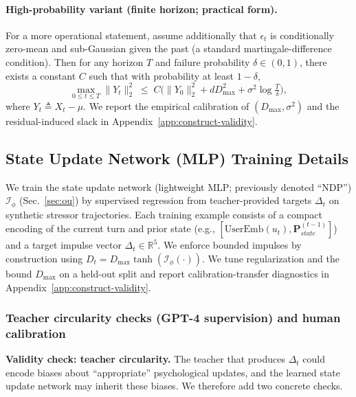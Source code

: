 \documentclass{article}
\begin{document}
\paragraph{High-probability variant (finite horizon; practical form).}
For a more operational statement, assume additionally that $\epsilon_t$ is conditionally zero-mean and sub-Gaussian given the past (a standard martingale-difference condition).
Then for any horizon $T$ and failure probability $\delta\in(0,1)$, there exists a constant $C$ such that with probability at least $1-\delta$,
\begin{equation}
\max_{0\le t\le T}\|Y_t\|_2^2 \;\le\; C\Big(\|Y_0\|_2^2 + dD_{\max}^2 + \sigma^2\log\tfrac{T}{\delta}\Big),
\end{equation}
where $Y_t\triangleq X_t-\mu$.
We report the empirical calibration of $(D_{\max},\sigma^2)$ and the residual-induced slack in Appendix~\ref{app:construct-validity}.



\subsection{State Update Network (MLP) Training Details}
\label{app:impact-table-training}
We train the state update network (lightweight MLP; previously denoted ``NDP'') $\mathcal{I}_\phi$ (Sec.~\ref{sec:ou}) by supervised regression from teacher-provided targets $\Delta_t$ on synthetic stressor trajectories.
Each training example consists of a compact encoding of the current turn and prior state (e.g., $[\text{UserEmb}(u_t),\mathbf{P}_{state}^{(t-1)}]$) and a target impulse vector $\Delta_t\in\mathbb{R}^5$.
We enforce bounded impulses by construction using $D_t=D_{\max}\tanh(\mathcal{I}_\phi(\cdot))$.
We tune regularization and the bound $D_{\max}$ on a held-out split and report calibration-transfer diagnostics in Appendix~\ref{app:construct-validity}.

\subsubsection{Teacher circularity checks (GPT-4 supervision) and human calibration}
\textbf{Validity check: teacher circularity.} The teacher that produces $\Delta_t$ could encode biases about ``appropriate'' psychological updates, and the learned state update network may inherit these biases.
We therefore add two concrete checks.
\end{document}
